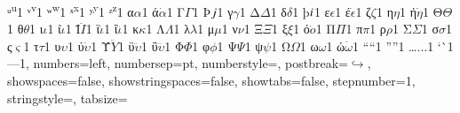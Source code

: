 {		{ᵘ}{{\textsuperscript{u}}}1 {ᵛ}{{\textsuperscript{v}}}1
		{ʷ}{{\textsuperscript{w}}}1 {ˣ}{{\textsuperscript{x}}}1
		{ʸ}{{\textsuperscript{y}}}1 {ᶻ}{{\textsuperscript{z}}}1
		{α}{{$\alpha$}}1 {ά}{{$\dot \alpha$}}1 {Γ}{{$\Gamma$}}1 {Þ}{{$\Thorn$}}1
		{γ}{{$\gamma$}}1 {Δ}{{$\Delta$}}1 {δ}{{$\delta$}}1 {þ}{{$\thorn$}}1
		{ε}{{$\epsilon$}}1 {έ}{{$\dot \epsilon$}}1 {ζ}{{$\zeta$}}1
		{η}{{$\eta$}}1 {ή}{{$\dot \eta$}}1 {Θ}{{$\Theta$}}1
		{θ}{{$\theta$}}1 {ι}{{$\iota$}}1 {ί}{{$\dot \iota$}}1
		{Ϊ}{{$\ddot I$}}1 {ϊ}{{$\ddot \iota$}}1 {ΐ}{{$\dddot \iota$}}1
		{κ}{{$\kappa$}}1 {Λ}{{$\Lambda$}}1 {λ}{{$\lambda$}}1
		{μ}{{$\mu$}}1 {ν}{{$\nu$}}1 {Ξ}{{$\Xi$}}1 {ξ}{{$\xi$}}1
		{ό}{{$\dot o$}}1 {Π}{{$\Pi$}}1 {π}{{$\pi$}}1 {ρ}{{$\rho$}}1
		{Σ}{{$\Sigma$}}1 {σ}{{$\sigma$}}1 {ς}{{$\varsigma$}}1 {τ}{{$\tau$}}1
		{υ}{{$\upsilon$}}1 {ύ}{{$\dot \upsilon$}}1 {Ϋ}{{$\ddot Y$}}1
		{ϋ}{{$\ddot \upsilon$}}1 {ΰ}{{$\dddot \upsilon$}}1
		{Φ}{{$\Phi$}}1 {φ}{{$\phi$}}1 {Ψ}{{$\Psi$}}1 {ψ}{{$\psi$}}1
		{Ω}{{$\Omega$}}1 {ω}{{$\omega$}}1 {ώ}{{$\dot \omega$}}1
		{“}{{``}}1 {”}{{''}}1 {…}{{$\ldots$}}1 {`}{\`}1 {–}{{--}}1,
	numbers=left,
	numbersep={\sourcecodenumbersep pt},
	numberstyle=\sourcecodenumbersize\color{dkgray},
	postbreak=\mbox{$\hookrightarrow$\space},
	showspaces=false,
	showstringspaces=false,
	showtabs=false,
	stepnumber=1,
	stringstyle=\color{mauve},
	tabsize={\sourcecodetabsize}
}

